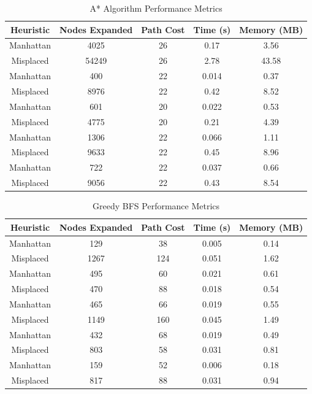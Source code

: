 \documentclass{report}
\begin{document}
\begin{table}[htbp]
	\centering
	\caption{A* Algorithm Performance Metrics}
	\label{tab:astar_performance}
		\begin{tabular}{ccccc}
			\toprule
			\textbf{Heuristic} & \textbf{Nodes Expanded} & \textbf{Path Cost} & \textbf{Time (s)} & \textbf{Memory (MB)} \\
			\midrule
			Manhattan & 4025 & 26 & 0.17 & 3.56 \\
			Misplaced & 54249 & 26 & 2.78 & 43.58 \\
			\cmidrule(r){1-5}
			Manhattan & 400 & 22 & 0.014 & 0.37 \\
			Misplaced & 8976 & 22 & 0.42 & 8.52 \\
			\cmidrule(r){1-5}
			Manhattan & 601 & 20 & 0.022 & 0.53 \\
			Misplaced & 4775 & 20 & 0.21 & 4.39 \\
			\cmidrule(r){1-5}
			Manhattan & 1306 & 22 & 0.066 & 1.11 \\
			Misplaced & 9633 & 22 & 0.45 & 8.96 \\
			\cmidrule(r){1-5}
			Manhattan & 722 & 22 & 0.037 & 0.66 \\
			Misplaced & 9056 & 22 & 0.43 & 8.54 \\
			\bottomrule
		\end{tabular}%
\end{table}

\begin{table}[htbp]
	\centering
	\caption{Greedy BFS Performance Metrics}
	\label{tab:gbfs_performance}
		\begin{tabular}{ccccc}
			\toprule
			\textbf{Heuristic} & \textbf{Nodes Expanded} & \textbf{Path Cost} & \textbf{Time (s)} & \textbf{Memory (MB)} \\
			\midrule
			Manhattan & 129 & 38 & 0.005 & 0.14 \\
			Misplaced & 1267 & 124 & 0.051 & 1.62 \\
			\cmidrule(r){1-5}
			Manhattan & 495 & 60 & 0.021 & 0.61 \\
			Misplaced & 470 & 88 & 0.018 & 0.54 \\
			\cmidrule(r){1-5}
			Manhattan & 465 & 66 & 0.019 & 0.55 \\
			Misplaced & 1149 & 160 & 0.045 & 1.49 \\
			\cmidrule(r){1-5}
			Manhattan & 432 & 68 & 0.019 & 0.49 \\
			Misplaced & 803 & 58 & 0.031 & 0.81 \\
			\cmidrule(r){1-5}
			Manhattan & 159 & 52 & 0.006 & 0.18 \\
			Misplaced & 817 & 88 & 0.031 & 0.94 \\
			\bottomrule
		\end{tabular}%
\end{table}
\end{document}
